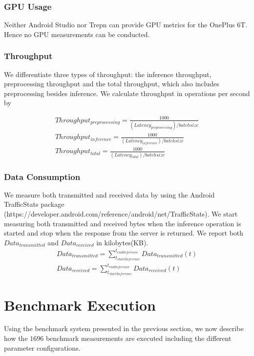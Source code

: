 \subsubsection{GPU Usage}
Neither Android Studio nor Trepn can provide GPU metrics for the OnePlus 6T. Hence no GPU measurements can be conducted.
\subsubsection{Throughput}
We differentiate three types of throughput: the inference throughput, preprocessing throughput and the total throughput, which also includes preprocessing besides inference.
We calculate throughput in operations per second by 

\begin{equation*}
\begin{gathered}
Throughput_{preprocessing} =\frac{1000}{(Latency_{preprocessing}) / batchsize}\\
Throughput_{inference} =\frac{1000}{(Latency_{inference}) / batchsize}\\
Throughput_{total}  =\frac{1000}{(Latency_{total}) / batchsize}
\end{gathered}
\end{equation*}
\subsubsection{Data Consumption}
We measure both transmitted and received data by using the Android TrafficStats package (https://developer.android.com/reference/android/net/TrafficStats). We start measuring both transmitted and received bytes when the inference operation is started and stop when the response from the server is returned. We report both $Data_{transmitted}$ and $Data_{received}$ in kilobytes(KB).
\begin{equation*}
\begin{gathered}
Data_{transmitted} = \sum_{t_{startInference}}^{t_{endInference}} Data_{transmitted}(t)\\
Data_{received} = \sum_{t_{startInference}}^{t_{endInference}} Data_{received}(t)
\end{gathered}
\end{equation*}

\section{Benchmark Execution}
\label{chap:benchmarkExec}
Using the benchmark system presented in the previous section, we now describe how the $1696$ benchmark measurements are executed including the different parameter configurations.


